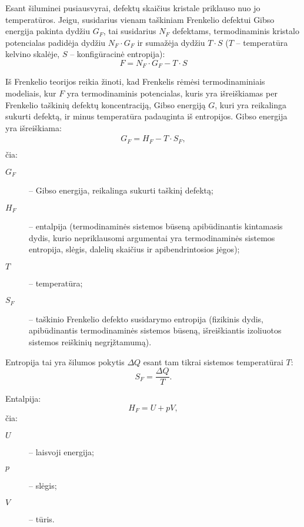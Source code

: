 Esant šiluminei pusiausvyrai, defektų skaičius kristale priklauso nuo
jo temperatūros. Jeigu, susidarius vienam taškiniam Frenkelio 
defektui Gibso energija pakinta dydžiu $G_{F}$, tai susidarius $N_F$
defektams, termodinaminis kristalo potencialas padidėja dydžiu
$N_F \cdot G_F$ ir sumažėja dydžiu $T \cdot S$ ($T$ – temperatūra
kelvino skalėje, $S$ – konfigūracinė entropija):
\begin{equation*}
	F = N_F \cdot G_F - T \cdot S
\end{equation*}

Iš Frenkelio teorijos reikia žinoti, kad Frenkelis rėmėsi termodinaminiais
modeliais, kur $F$ yra termodinaminis potencialas, kuris yra išreiškiamas
per Frenkelio taškinių defektų koncentraciją, Gibso energiją $G$, kuri
yra reikalinga sukurti defektą, ir minus temperatūra padauginta iš
entropijos. Gibso energija yra išreiškiama:
\begin{align*}
  G_{F} = H_{F} - T \cdot S_{F}, \\
\end{align*}
čia:
\begin{description}
  \item[$G_{F}$] – Gibso energija, reikalinga sukurti taškinį defektą;
  \item[$H_{F}$] – entalpija (termodinaminės sistemos būseną
    apibūdinantis kintamasis dydis, kurio nepriklausomi argumentai yra
    termodinaminės sistemos entropija, slėgis, dalelių skaičius ir
    apibendrintosios jėgos);
  \item[$T$] – temperatūra;
  \item[$S_{F}$] – taškinio Frenkelio defekto susidarymo entropija
    (fizikinis dydis, apibūdinantis termodinaminės sistemos būseną,
    išreiškiantis izoliuotos sistemos reiškinių negrįžtamumą).
\end{description}

Entropija tai yra šilumos pokytis $\Delta Q$ esant tam tikrai
sistemos temperatūrai $T$:
\begin{equation*}
  S_{F} = \frac{\Delta Q}{T}.
\end{equation*}

Entalpija:
\begin{equation*}
  H_{F} = U + pV,
\end{equation*}
čia:
\begin{description}
  \item[$U$] – laisvoji energija;
  \item[$p$] – slėgis;
  \item[$V$] – tūris.
\end{description}

